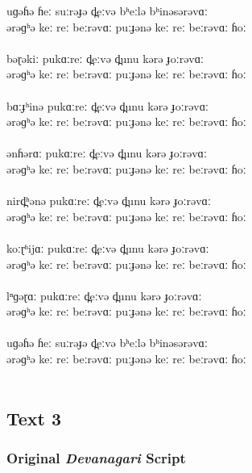 \documentclass[17pt]{extarticle}
\begin{document}
uɡəɦə ɦeː suːrəɟə d̪eːvə bʰeːlə bʰinəsərəvɑː \\
ərəɡʰə keː reː beːrəvɑː puːɟənə keː reː beːrəvɑː ɦoː\\\\
bəɽəkiː pukɑːreː d̪eːvə d̪unu kərə ɟoːrəvɑː \\
ərəɡʰə keː reː beːrəvɑː puːɟənə keː reː beːrəvɑː ɦoː\\\\
bɑːɟʰinə pukɑːreː d̪eːvə d̪unu kərə ɟoːrəvɑː \\
ərəɡʰə keː reː beːrəvɑː puːɟənə keː reː beːrəvɑː ɦoː\\\\
ənɦərɑː pukɑːreː d̪eːvə d̪unu kərə ɟoːrəvɑː \\
ərəɡʰə keː reː beːrəvɑː puːɟənə keː reː beːrəvɑː ɦoː\\\\
nird̪ʰənə pukɑːreː d̪eːvə d̪unu kərə ɟoːrəvɑː \\
ərəɡʰə keː reː beːrəvɑː puːɟənə keː reː beːrəvɑː ɦoː\\\\
koːɽʱijɑː pukɑːreː d̪eːvə d̪unu kərə ɟoːrəvɑː \\
ərəɡʰə keː reː beːrəvɑː puːɟənə keː reː beːrəvɑː ɦoː\\\\
lⁿɡəɽɑː pukɑːreː d̪eːvə d̪unu kərə ɟoːrəvɑː \\
ərəɡʰə keː reː beːrəvɑː puːɟənə keː reː beːrəvɑː ɦoː\\\\
uɡəɦə ɦeː suːrəɟə d̪eːvə bʰeːlə bʰinəsərəvɑː \\
ərəɡʰə keː reː beːrəvɑː puːɟənə keː reː beːrəvɑː ɦoː\\\\

\subsection*{\textbf{Text 3}}

\subsubsection*{\textbf{Original \emph{Devanagari} Script}}
\end{document}

